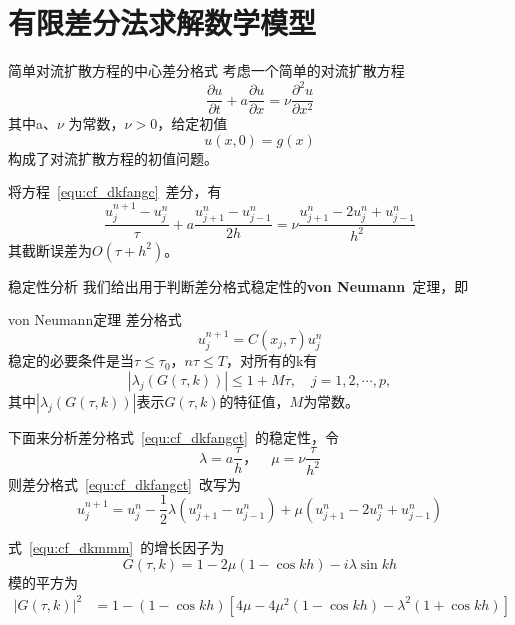 \documentclass[xcolor=dvipsnames]{beamer}
\begin{document}
\section{有限差分法求解数学模型}
\begin{frame}{简单对流扩散方程的中心差分格式}
考虑一个简单的对流扩散方程
\begin{equation}\label{equ:cf_dkfangc}
	\dfrac{\partial u}{\partial t}+a\dfrac{\partial u}{\partial x}=\nu\dfrac{\partial^2 u}{\partial x^2}
\end{equation}
其中a、$\nu$ 为常数，$\nu>0$，给定初值
\begin{equation}
	u(x,0)=g(x)
\end{equation}
构成了对流扩散方程的初值问题。\par
将方程~\ref{equ:cf_dkfangc}~差分，有
\begin{equation}\label{equ:cf_dkfangct}
	\dfrac{u^{n+1}_j-u^{n}_{j}}{\tau}+a\dfrac{u^{n}_{j+1}-u^n_{j-1}}{2h}=\nu\dfrac{u^n_{j+1}-2u^n_j+u^n_{j-1}}{h^2}
\end{equation}
其截断误差为$O(\tau+h^2)$。\par
\end{frame}
\begin{frame}{稳定性分析}
我们给出用于判断差分格式稳定性的\textbf{von Neumann}~定理，即
\begin{block}{von Neumann定理}
\kaishu
差分格式
\begin{equation}
	u^{n+1}_j=C(x_j,\tau)u^n_j
\end{equation}
稳定的必要条件是当$\tau\leq\tau_0$，$n\tau\leq T$，对所有的k有
\begin{equation}
	\left|\lambda_j(G(\tau,k))\right| \leq 1+M\tau,\quad j=1,2,\cdots,p,
\end{equation}
其中$\left|\lambda_j(G(\tau,k))\right|$表示$G(\tau,k)$的特征值，$M$为常数。
\end{block}
\end{frame}
\begin{frame}
下面来分析差分格式~\ref{equ:cf_dkfangct}~的稳定性，令
\begin{equation}
	\lambda = a\dfrac{\tau}{h}，\quad\mu=\nu\dfrac{\tau}{h^2}
\end{equation}
则差分格式~\ref{equ:cf_dkfangct}~改写为
\begin{equation}\label{equ:cf_dkmmm}
u^{n+1}_j=u^n_j-\frac{1}{2}\lambda(u^n_{j+1}-u^n_{j-1})+\mu(u^n_{j+1}-2u^n_j+u^n_{j-1})
\end{equation}\par
式~\ref{equ:cf_dkmmm}~的增长因子为
\begin{equation}
	G(\tau,k)=1-2\mu(1-\cos kh)-i\lambda\sin kh
\end{equation}
模的平方为
\begin{equation}
\begin{aligned}
	|G(\tau,k)|^2 &= 1-(1-\cos kh)[4\mu-4\mu^2(1-\cos kh)-\lambda^2(1+\cos kh)]
\end{aligned}				  
\end{equation}
\end{frame}
\end{document}
